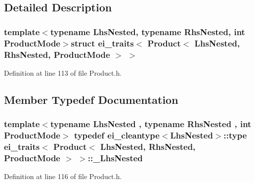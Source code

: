 \subsection{Detailed Description}
\subsubsection*{template$<$typename Lhs\-Nested, typename Rhs\-Nested, int Product\-Mode$>$struct ei\-\_\-traits$<$ Product$<$ Lhs\-Nested, Rhs\-Nested, Product\-Mode $>$ $>$}



Definition at line 113 of file Product.\-h.



\subsection{Member Typedef Documentation}
\hypertarget{structei__traits_3_01_product_3_01_lhs_nested_00_01_rhs_nested_00_01_product_mode_01_4_01_4_a86d93068944e008d4609fe6e8ce51db2}{
\subsubsection[{\-\_\-\-Lhs\-Nested}]{\setlength{\rightskip}{0pt plus 5cm}template$<$typename Lhs\-Nested , typename Rhs\-Nested , int Product\-Mode$>$ typedef {\bf ei\-\_\-cleantype}$<$Lhs\-Nested$>$\-::{\bf type} {\bf ei\-\_\-traits}$<$ {\bf Product}$<$ Lhs\-Nested, Rhs\-Nested, Product\-Mode $>$ $>$\-::{\bf \-\_\-\-Lhs\-Nested}}}\label{structei__traits_3_01_product_3_01_lhs_nested_00_01_rhs_nested_00_01_product_mode_01_4_01_4_a86d93068944e008d4609fe6e8ce51db2}


Definition at line 116 of file Product.\-h.

